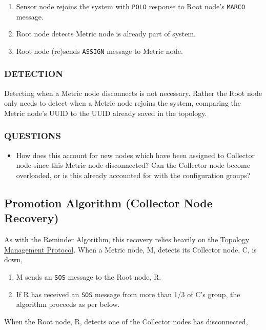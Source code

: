 \begin{enumerate}
\item Sensor node rejoins the system with \texttt{POLO} response to Root node's \texttt{MARCO} message.
\item Root node detects Metric node is already part of \dcamp system.
\item Root node (re)sends \texttt{ASSIGN} message to Metric node.
\end{enumerate}

\subsubsection{DETECTION}

Detecting when a Metric node disconnects is not necessary. Rather the Root node only needs to detect when a Metric node
rejoins the \dcamp system, comparing the Metric node's UUID to the UUID already saved in the topology.

\subsubsection{QUESTIONS}

\begin{itemize}
\item How does this account for new nodes which have been assigned to Collector node since this Metric node
      disconnected? Can the Collector node become overloaded, or is this already accounted for with the configuration
      groups?
\end{itemize}

\subsection{Promotion Algorithm (Collector Node Recovery)}
\label{algor_promo}

As with the Reminder Algorithm, this recovery relies heavily on the \hyperref[proto_topo]{Topology Management Protocol}.
When a Metric node, M, detects its Collector node, C, is down, 

\begin{enumerate}
\item M sends an \texttt{SOS} message to the Root node, R.
\item If R has received an \texttt{SOS} message from more than 1/3 of C's group, the algorithm proceeds as per below.
\end{enumerate}

When the Root node, R, detects one of the Collector nodes has disconnected,

